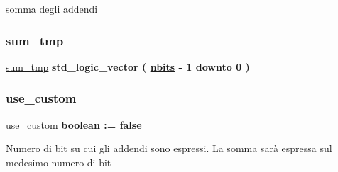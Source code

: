 somma degli addendi 

\mbox{\label{group___adder_ga590914af948ec283f1371002f2f76720}} 
\subsubsection{\texorpdfstring{sum\+\_\+tmp}{sum\_tmp}}
{\footnotesize\ttfamily \hyperlink{group___adder_ga590914af948ec283f1371002f2f76720}{sum\+\_\+tmp} {\bfseries \textcolor{vhdlchar}{std\+\_\+logic\+\_\+vector}\textcolor{vhdlchar}{ }\textcolor{vhdlchar}{(}\textcolor{vhdlchar}{ }\textcolor{vhdlchar}{ }\textcolor{vhdlchar}{ }\textcolor{vhdlchar}{ }{\bfseries \hyperlink{group___adder_gae1435c07d0cd54b521535e2f8de6f94e}{nbits}} \textcolor{vhdlchar}{-\/}\textcolor{vhdlchar}{ } \textcolor{vhdldigit}{1} \textcolor{vhdlchar}{ }\textcolor{vhdlchar}{downto}\textcolor{vhdlchar}{ }\textcolor{vhdlchar}{ } \textcolor{vhdldigit}{0} \textcolor{vhdlchar}{ }\textcolor{vhdlchar}{)}\textcolor{vhdlchar}{ }} \hspace{0.3cm}{\ttfamily [Signal]}}

\mbox{\label{group___adder_gadf05ca347ec6d3c85740dc697469b3db}} 
\subsubsection{\texorpdfstring{use\+\_\+custom}{use\_custom}}
{\footnotesize\ttfamily \hyperlink{group___adder_gadf05ca347ec6d3c85740dc697469b3db}{use\+\_\+custom} {\bfseries \textcolor{vhdlchar}{ }} {\bfseries \textcolor{vhdlchar}{boolean}\textcolor{vhdlchar}{ }\textcolor{vhdlchar}{ }\textcolor{vhdlchar}{\+:}\textcolor{vhdlchar}{=}\textcolor{vhdlchar}{ }\textcolor{vhdlchar}{ }\textcolor{vhdlchar}{ }\textcolor{vhdlchar}{ }\textcolor{vhdlchar}{false}\textcolor{vhdlchar}{ }} \hspace{0.3cm}{\ttfamily [Generic]}}

Numero di bit su cui gli addendi sono espressi. La somma sarà espressa sul medesimo numero di bit 